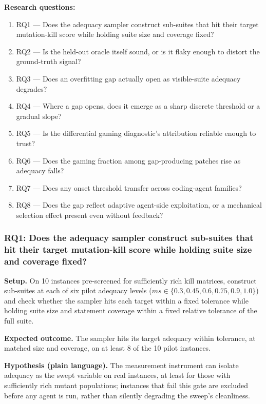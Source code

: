 \documentclass[11pt]{article}
\begin{document}
\textbf{Research questions:}
\begin{enumerate}[leftmargin=1.6em]
\item RQ1 --- Does the adequacy sampler construct sub-suites that hit their target mutation-kill score while holding suite size and coverage fixed?
\item RQ2 --- Is the held-out oracle itself sound, or is it flaky enough to distort the ground-truth signal?
\item RQ3 --- Does an overfitting gap actually open as visible-suite adequacy degrades?
\item RQ4 --- Where a gap opens, does it emerge as a sharp discrete threshold or a gradual slope?
\item RQ5 --- Is the differential gaming diagnostic's attribution reliable enough to trust?
\item RQ6 --- Does the gaming fraction among gap-producing patches rise as adequacy falls?
\item RQ7 --- Does any onset threshold transfer across coding-agent families?
\item RQ8 --- Does the gap reflect adaptive agent-side exploitation, or a mechanical selection effect present even without feedback?
\end{enumerate}

\subsubsection{RQ1: Does the adequacy sampler construct sub-suites that hit their target mutation-kill score while holding suite size and coverage fixed?}
\textbf{Setup.} On 10 instances pre-screened for sufficiently rich kill matrices, construct sub-suites at each of six pilot adequacy levels ($ms \in \{0.3, 0.45, 0.6, 0.75, 0.9, 1.0\}$) and check whether the sampler hits each target within a fixed tolerance while holding suite size and statement coverage within a fixed relative tolerance of the full suite.

\textbf{Expected outcome.} The sampler hits its target adequacy within tolerance, at matched size and coverage, on at least 8 of the 10 pilot instances.

\textbf{Hypothesis (plain language).} The measurement instrument can isolate adequacy as the swept variable on real instances, at least for those with sufficiently rich mutant populations; instances that fail this gate are excluded before any agent is run, rather than silently degrading the sweep's cleanliness.
\end{document}
